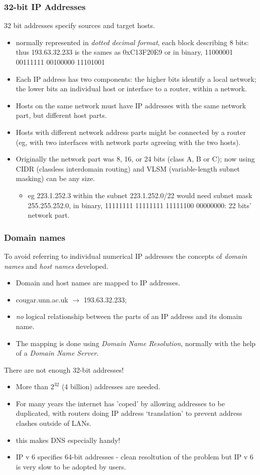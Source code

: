 \documentclass[10pt, hyperref={pdfpagelabels=false}]{beamer}
\begin{document}
\begin{frame}
\frametitle{32-bit IP Addresses}
32 bit addresses specify sources and target hosts.
\begin{itemize}
\item normally represented in \emph{dotted decimal format}, each block describing 8 bits: thus 193.63.32.233 is the sames as 0xC13F20E9 or in binary, 11000001 00111111 00100000 11101001
\item Each IP address has two components: the higher bits identify a local network; the lower bits an individual host or interface to a router, within a network.
\item Hosts on the same network must have IP addresses with the same network part, but different host parts.
\item Hosts with different network address parts might be connected by a router (eg, with two interfaces with network parts agreeing with the two hosts).
\item Originally the network part was 8, 16, or 24 bits (class A, B or C); now using CIDR (classless interdomain routing) and VLSM (variable-length subnet masking) can be any size.
  \begin{itemize}
  \item eg 223.1.252.3 within the subnet 223.1.252.0/22 would need subnet mask 255.255.252.0, in binary, 11111111 11111111 11111100 00000000: 22 bits' network part.
  \end{itemize}
\end{itemize}
\end{frame}

\begin{frame}
\frametitle{Domain names}
To avoid referring to individual numerical IP addresses the concepts of \emph{domain names} and \emph{host names} developed.
\begin{itemize}
\item Domain and host names are mapped to IP addresses.
\item cougar.unn.ac.uk $\longrightarrow$ 193.63.32.233;
\item \emph{no} logical relationship between the parts of an IP address and its domain name.
\item The mapping is done using \emph{Domain Name Resolution}, normally with the help of a \emph{Domain Name Server}.
\end{itemize}

There are not enough 32-bit addresses!
\begin{itemize}
\item More than $2^{32}$ (4 billion) addresses are needed.
\item For many years the internet has 'coped' by allowing addresses to be duplicated, with routers doing IP address `translation' to prevent address clashes outside of LANs.
\item this makes DNS especially handy!
\item IP v 6 specifies 64-bit addresses -  clean resoltution of the problem but IP v 6 is very slow to be adopted by users.
\end{itemize}
\end{frame}
\end{document}
